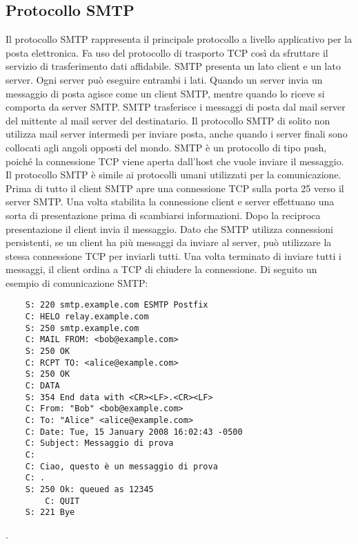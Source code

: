 \subsection{Protocollo SMTP}
Il protocollo SMTP rappresenta il principale protocollo a livello applicativo per la posta elettronica. 
Fa uso del protocollo di trasporto TCP così da sfruttare il servizio di trasferimento dati affidabile. 
SMTP presenta un lato client e un lato server. Ogni server può eseguire entrambi i lati. 
Quando un server invia un messaggio di posta agisce come un client SMTP, mentre quando lo riceve si comporta 
da server SMTP.
SMTP trasferisce i messaggi di posta dal mail server del mittente al mail server del destinatario. 
Il protocollo SMTP di solito non utilizza mail server intermedi per inviare posta, anche quando i server finali 
sono collocati agli angoli opposti del mondo.
SMTP è un protocollo di tipo push, poiché la connessione TCP viene aperta dall’host che vuole inviare il messaggio. 
Il protocollo SMTP è simile ai protocolli umani utilizzati per la comunicazione. 
Prima di tutto il client SMTP apre una connessione TCP sulla porta 25 verso il server SMTP. 
Una volta stabilita la connessione client e server effettuano una sorta di presentazione prima di scambiarsi 
informazioni. Dopo la reciproca presentazione il client invia il messaggio.
Dato che SMTP utilizza connessioni persistenti, se un client ha più messaggi da inviare al server, 
può utilizzare la stessa connessione TCP per inviarli tutti. Una volta terminato di inviare tutti i messaggi, 
il client ordina a TCP di chiudere la connessione.
Di seguito un esempio di comunicazione SMTP:

\begin{verbatim}
    S: 220 smtp.example.com ESMTP Postfix
    C: HELO relay.example.com
    S: 250 smtp.example.com
    C: MAIL FROM: <bob@example.com>
    S: 250 OK
    C: RCPT TO: <alice@example.com>
    S: 250 OK
    C: DATA
    S: 354 End data with <CR><LF>.<CR><LF>
    C: From: "Bob" <bob@example.com>
    C: To: "Alice" <alice@example.com>
    C: Date: Tue, 15 January 2008 16:02:43 -0500
    C: Subject: Messaggio di prova
    C: 
    C: Ciao, questo è un messaggio di prova
    C: .
    S: 250 Ok: queued as 12345
        C: QUIT
    S: 221 Bye
\end{verbatim}\cite{SMTP}.

